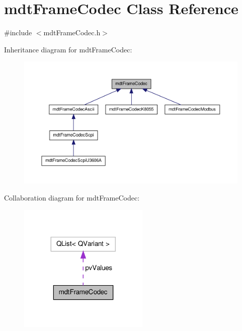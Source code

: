 \hypertarget{classmdt_frame_codec}{\section{mdt\-Frame\-Codec Class Reference}
\label{classmdt_frame_codec}
}


{\ttfamily \#include $<$mdt\-Frame\-Codec.\-h$>$}



Inheritance diagram for mdt\-Frame\-Codec\-:\nopagebreak
\begin{figure}[H]
\begin{center}
\leavevmode
\includegraphics[width=350pt]{classmdt_frame_codec__inherit__graph}
\end{center}
\end{figure}


Collaboration diagram for mdt\-Frame\-Codec\-:\nopagebreak
\begin{figure}[H]
\begin{center}
\leavevmode
\includegraphics[width=176pt]{classmdt_frame_codec__coll__graph}
\end{center}
\end{figure}
